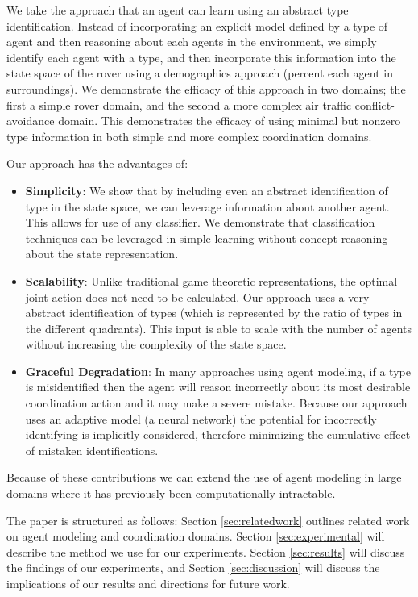 \documentclass{aamas2014}
\begin{document}
We take the approach that an agent can learn using an abstract type identification. Instead of incorporating an explicit model defined by a type of agent and then reasoning about each agents in the environment, we simply identify each agent with a type, and then incorporate this information into the state space of the rover using a demographics approach (percent each agent in surroundings). We demonstrate the efficacy of this approach in two domains; the first a simple rover domain, and the second a more complex air traffic conflict-avoidance domain. This demonstrates the efficacy of using minimal but nonzero type information in both simple and more complex coordination domains.

Our approach has the advantages of:
\begin{itemize}
\item \textbf{Simplicity}: We show that by including even an abstract identification of type in the state space, we can leverage information about another agent. This allows for use of any classifier. We demonstrate that classification techniques can be leveraged in simple learning without concept reasoning about the state representation.

\item \textbf{Scalability}: Unlike traditional game theoretic representations, the optimal joint action does not need to be calculated. Our approach uses a very abstract identification of types (which is represented by the ratio of types in the different quadrants). This input is able to scale with the number of agents without increasing the complexity of the state space.

\item \textbf{Graceful Degradation}: In many approaches using agent modeling, if a type is misidentified then the agent will reason incorrectly about its most desirable coordination action and it may make a severe mistake. Because our approach uses an adaptive model (a neural network) the potential for incorrectly identifying is implicitly considered, therefore minimizing the cumulative effect of mistaken identifications.

\end{itemize}

Because of these contributions we can extend the use of agent modeling in large domains where it has previously been computationally intractable.

The paper is structured as follows: Section \ref{sec:relatedwork} outlines related work on agent modeling and coordination domains. Section \ref{sec:experimental} will describe the method we use for our experiments. Section \ref{sec:results} will discuss the findings of our experiments, and Section \ref{sec:discussion} will discuss the implications of our results and directions for future work.
\end{document}
